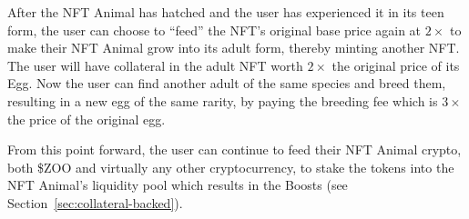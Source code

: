 After the NFT Animal has hatched and the user has experienced it in its teen form, the user can choose to ``feed'' the NFT's original base price again at $2\times$ to make their NFT Animal grow into its adult form, thereby minting another NFT. The user will have collateral in the adult NFT worth $2\times$ the original price of its Egg. Now the user can find another adult of the same species and breed them, resulting in a new egg of the same rarity, by paying the breeding fee which is $3\times$ the price of the original egg.

From this point forward, the user can continue to feed their NFT Animal crypto, both \$ZOO and virtually any other cryptocurrency, to stake the tokens into the NFT Animal's liquidity pool which results in the Boosts (see Section~\ref{sec:collateral-backed}).
